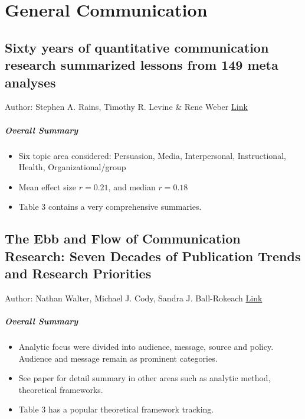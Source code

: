 \chapter{General Communication}

\section{Sixty years of quantitative communication research summarized lessons from 149 meta analyses}
Author: Stephen A. Rains, Timothy R. Levine \& Rene Weber
\href{https://www.tandfonline.com/doi/full/10.1080/23808985.2018.1446350}{Link}

\paragraph{Overall Summary} 
\begin{itemize}
    \item Six topic area considered: Persuasion, Media, Interpersonal, Instructional, Health, Organizational/group 
    \item Mean effect size $r=0.21$, and median $r=0.18$ 
    \item Table 3 contains a very comprehensive summaries. 
\end{itemize}




\section{The Ebb and Flow of Communication Research: Seven Decades of Publication Trends and Research Priorities}

Author: Nathan Walter, Michael J. Cody, Sandra J. Ball-Rokeach
\href{https://academic.oup.com/joc/article/68/2/424/4958955}{Link}

\paragraph{Overall Summary}
\begin{itemize}
    \item Analytic focus were divided into audience, message, source and policy. Audience and message remain as prominent categories. 
    \item See paper for detail summary in other areas such as analytic method, theoretical frameworks. 
    \item Table 3 has a popular theoretical framework tracking. 
\end{itemize}





